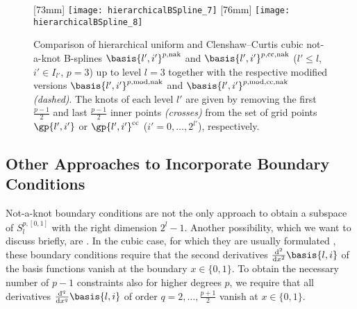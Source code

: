 \begin{figure}
  [73mm]{%
    \texttt{[image: hierarchicalBSpline\_7]}%
  }%
  \hfill
  [76mm]{%
    \texttt{[image: hierarchicalBSpline\_8]}%
  }%
  \caption{%
    Comparison of hierarchical uniform and Clenshaw--Curtis cubic not-a-knot
    B-splines $\basis{l',i'}^{p,\notaknot}$ and
    $\basis{l',i'}^{p,\clenshawcurtis,\notaknot}$
    ($l ' \le l$, $i' \in I_{l'}$, $p = 3$) up to level $l = 3$
    together with the respective modified versions
    $\basis{l',i'}^{p,\modified,\notaknot}$ and
    $\basis{l',i'}^{p,\modified,\clenshawcurtis,\notaknot}$
    \emph{(dashed)}.
    The knots of each level $l'$ are given by removing the
    first $\tfrac{p-1}{2}$ and last $\tfrac{p-1}{2}$
    inner points \emph{(crosses)}
    from the set of grid points $\gp{l',i'}$ or
    $\gp{l',i'}^\clenshawcurtis$
    ($i' = 0, \dotsc, 2^{l'}$), respectively.%
  }%
\end{figure}



\subsection{Other Approaches to Incorporate Boundary Conditions}
\label{sec:324naturalBoundary}

Not-a-knot boundary conditions are not the only approach
to obtain a subspace of $S_l^{p,[0,1]}$ with the right dimension $2^l - 1$.
Another possibility, which we want to discuss briefly, are
.
In the cubic case, for which they are usually formulated
\cite{Hoellig13Approximation},
these boundary conditions require that the
second derivatives $\frac{\diff^2}{\dx^2} \basis{l,i}$ of the
basis functions vanish at the boundary $x \in \{0, 1\}$.
To obtain the necessary number of $p - 1$ constraints also
for higher degrees $p$,
we require that all derivatives
$\frac{\diff^q}{\dx^q} \basis{l,i}$ of order
$q = 2, \dotsc, \tfrac{p+1}{2}$ vanish at $x \in \{0, 1\}$.

